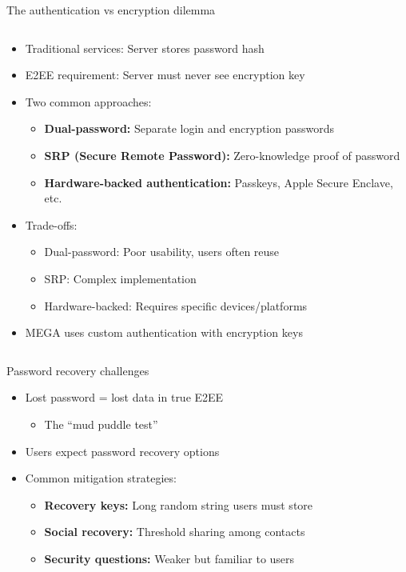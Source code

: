 \documentclass[aspectratio=169, lualatex, handout]{beamer}
\begin{document}
\begin{frame}{The authentication vs encryption dilemma}
	\begin{columns}[c]
		\begin{column}{1\textwidth}
			\begin{itemize}
				\item Traditional services: Server stores password hash
				\item E2EE requirement: Server must never see encryption key
				\item Two common approaches:
				      \begin{itemize}
					      \item \textbf{Dual-password:} Separate login and encryption passwords
					      \item \textbf{SRP (Secure Remote Password):} Zero-knowledge proof of password
					      \item \textbf{Hardware-backed authentication:} Passkeys, Apple Secure Enclave, etc.
				      \end{itemize}
				\item Trade-offs:
				      \begin{itemize}
					      \item Dual-password: Poor usability, users often reuse
					      \item SRP: Complex implementation
					      \item Hardware-backed: Requires specific devices/platforms
				      \end{itemize}
				\item MEGA uses custom authentication with encryption keys
			\end{itemize}
		\end{column}
	\end{columns}
\end{frame}

\begin{frame}{Password recovery challenges}
	\begin{itemize}
		\item Lost password = lost data in true E2EE
		      \begin{itemize}
			      \item The ``mud puddle test''
		      \end{itemize}
		\item Users expect password recovery options
		\item Common mitigation strategies:
		      \begin{itemize}
			      \item \textbf{Recovery keys:} Long random string users must store
			      \item \textbf{Social recovery:} Threshold sharing among contacts
			      \item \textbf{Security questions:} Weaker but familiar to users
		      \end{itemize}
	\end{itemize}
\end{frame}
\end{document}

